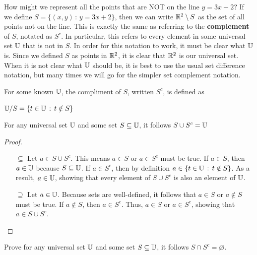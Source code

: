 How might we represent all the points that are NOT on the line $y=3x+2$? If we define $S=\{(x,y)\,:\,y=3x+2\}$, then we can write $\mathbb{R}^2 \setminus S$ as the set of all points not on the line. This is exactly the same as referring to the \textbf{complement} of $S$, notated as $S^c$. In particular, this refers to every element in some universal set $\U$ that is not in $S$. In order for this notation to work, it must be clear what $\U$ is. Since we defined $S$ as points in $\mathbb{R}^2$, it is clear that $\mathbb{R}^2$ is our universal set. When it is not clear what $\U$ should be, it is best to use the usual set difference notation, but many times we will go for the simpler set complement notation. \par

\begin{definition}
	For some known $\U$, the compliment of $S$, written $S^c$, is defined as \par$\mathbb{U} / S=\{t\in\mathbb{U}\,:\,t\notin S\}$
\end{definition}

\begin{theorem}
	For any universal set $\U$ and some set $S\subseteq\U$, it follows $S\cup S^c=\U$
\end{theorem}
\begin{proof}
	\begin{itemize}
		Let $\U$ be given and assume some set $S\subseteq\U$. To show $S\cup S^c=\U$, we will prove $S\cup S^c\subseteq\U$ and $S\cup S^c\supseteq\U$
		\item[$\subseteq$] Let $a\in S\cup S^c$. This means $a\in S$ or $a\in S^c$ must be true. If $a\in S$, then $a\in \mathbb{U}$ because $S\subseteq \U$. If $a\in S^c$, then by definition $a\in \{t\in\mathbb{U}\,:\,t\notin S\}$. As a result, $a\in \mathbb{U}$, showing that every element of $S\cup S^c$ is also an element of $\U$. 
		\item[$\supseteq$] Let $a\in \mathbb{U}$. Because sets are well-defined, it follows that $a\in S$ or $a\notin S$ must be true. If $a\notin S$, then $a\in S^c$. Thus, $a\in S$ or $a\in S^c$, showing that $a\in S\cup S^c$. 
	\end{itemize}
\end{proof}

\begin{exercise}
	Prove for any universal set $\U$ and some set $S\subseteq\U$, it follows $S\cap S^c=\varnothing$.
\end{exercise}
    \vspace{-3mm}

